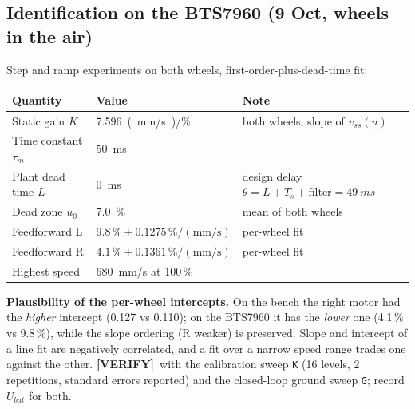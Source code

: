 \documentclass[11pt,a4paper]{article}
\newcommand{\mk}[2]{\textsf{\scriptsize\bfseries\colorbox{#1bg}{\color{#1}[#2]}}}
\newcommand{\VERIFY}{\mk{cold}{VERIFY}}
\newcommand{\code}[1]{\texttt{\small #1}}
\begin{document}
\subsection{Identification on the BTS7960 (9 Oct, wheels in the air)}\label{sec:ident}

Step and ramp experiments on both wheels, first-order-plus-dead-time fit:

\begin{center}
\small
\begin{tabular}{@{}lll@{}}
\toprule
\textbf{Quantity} & \textbf{Value} & \textbf{Note}\\
\midrule
Static gain $K$ & \qty{7.596}{(mm/s)/\percent} & both wheels, slope of $v_{ss}(u)$\\
Time constant $\tau_m$ & \qty{50}{ms} & \\
Plant dead time $L$ & \qty{0}{ms} & design delay $\theta=L+T_s+\text{filter}=\qty{49}{ms}$\\
Dead zone $u_0$ & \qty{7.0}{\percent} & mean of both wheels\\
Feedforward L & $9.8\,\% + 0.1275\,\%/(\text{mm/s})$ & per-wheel fit\\
Feedforward R & $4.1\,\% + 0.1361\,\%/(\text{mm/s})$ & per-wheel fit\\
Highest speed & \qty{680}{mm/s} at 100\,\% & \\
\bottomrule
\end{tabular}
\end{center}

\begin{warnbox}
\textbf{Plausibility of the per-wheel intercepts.} On the bench the right motor
had the \emph{higher} intercept (0.127 vs 0.110); on the BTS7960 it has the
\emph{lower} one (4.1\,\% vs 9.8\,\%), while the slope ordering (R weaker) is
preserved. Slope and intercept of a line fit are negatively correlated, and a
fit over a narrow speed range trades one against the other. \VERIFY\ with the
calibration sweep \code{K} (16 levels, 2 repetitions, standard errors reported)
and the closed-loop ground sweep \code{G}; record $U_{bat}$ for both.
\end{warnbox}
\end{document}

